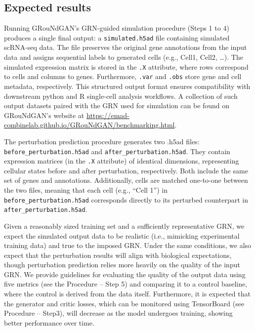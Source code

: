 \begin{tcolorbox}
\section*{Expected results}

Running GRouNdGAN’s GRN-guided simulation procedure (Steps 1 to 4) produces a single final
output: a \texttt{simulated.h5ad} file containing simulated scRNA-seq data. The file preserves the
original gene annotations from the input data and assigns sequential labels to generated cells
(e.g., Cell1, Cell2, …). The simulated expression matrix is stored in the \texttt{.X} attribute, where rows
correspond to cells and columns to genes. Furthermore, \texttt{.var} and \texttt{.obs} store gene and cell
metadata, respectively. This structured output format ensures compatibility with downstream
python and R single-cell analysis workflows. A collection of such output datasets paired with the
GRN used for simulation can be found on GRouNdGAN’s website at \url{https://emad-combinelab.github.io/GRouNdGAN/benchmarking.html}. 

The perturbation prediction procedure generates two .h5ad files:
\texttt{before\_perturbation.h5ad} and \texttt{after\_perturbation.h5ad}. They contain expression
matrices (in the \texttt{.X} attribute) of identical dimensions, representing cellular states before and
after perturbation, respectively. Both include the same set of genes and annotations.
Additionally, cells are matched one-to-one between the two files, meaning that each cell (e.g.,
“Cell 1”) in \texttt{before\_perturbation.h5ad} corresponds directly to its perturbed counterpart in
\texttt{after\_perturbation.h5ad}.

Given a reasonably sized training set and a sufficiently representative GRN, we expect the
simulated output data to be realistic (i.e., mimicking experimental training data) and true to the
imposed GRN. Under the same conditions, we also expect that the perturbation results will align
with biological expectations, though perturbation prediction relies more heavily on the quality of
the input GRN. We provide guidelines for evaluating the quality of the output data using five
metrics (see the Procedure – Step 5) and comparing it to a control baseline, where the control is
derived from the data itself. Furthermore, it is expected that the generator and critic losses,
which can be monitored using TensorBoard (see Procedure – Step3), will decrease as the model
undergoes training, showing better performance over time.


\end{tcolorbox}

